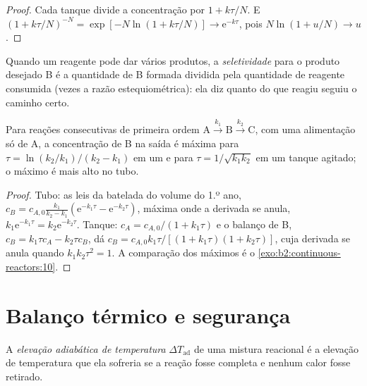 \begin{proof}
Cada tanque divide a concentração por $1 + k\tau/N$. E $(1 +
k\tau/N)^{-N} = \exp[-N\ln(1 + k\tau/N)] \to \mathrm e^{-k\tau}$, pois
$N\ln(1 + u/N) \to u$.
\end{proof}

\begin{definition}[Seletividade]\label{def:b2:continuous-reactors:selectivity}
Quando um reagente pode dar vários produtos, a \emph{seletividade}
para o produto desejado B é a quantidade de B formada dividida pela
quantidade de reagente consumida (vezes a razão estequiométrica): ela diz
quanto do que reagiu seguiu o caminho certo.
\end{definition}

\begin{proposition}\label{prop:b2:continuous-reactors:consecutive}
Para reações consecutivas de primeira ordem $\mathrm A \xrightarrow{k_1} \mathrm B
\xrightarrow{k_2} \mathrm C$, com uma alimentação só de A, a concentração
de B na saída é máxima para $\tau = \ln(k_2/k_1)/(k_2 - k_1)$ em um
 e para $\tau = 1/\sqrt{k_1k_2}$ em um tanque
agitado; o máximo é mais alto no tubo.
\end{proposition}

\begin{proof}
Tubo: as leis da batelada do volume do 1.º ano, $c_B = c_{A,0}\frac{k_1}{k_2 - k_1}
(\mathrm e^{-k_1\tau} - \mathrm e^{-k_2\tau})$, máxima onde a derivada
se anula, $k_1\mathrm e^{-k_1\tau} = k_2\mathrm e^{-k_2\tau}$. Tanque: $c_A =
c_{A,0}/(1 + k_1\tau)$ e o balanço de B, $c_B = k_1\tau c_A - k_2\tau c_B$,
dá $c_B = c_{A,0}k_1\tau/[(1 + k_1\tau)(1 + k_2\tau)]$, cuja derivada
se anula quando $k_1k_2\tau^2 = 1$. A comparação dos máximos é o
\cref{exo:b2:continuous-reactors:10}.
\end{proof}

\section{Balanço térmico e segurança}

\begin{definition}\label{def:b2:continuous-reactors:adiabatic-rise}
A \emph{elevação adiabática de temperatura}
$\Delta T_{\text{ad}}$ de uma mistura reacional é a elevação de temperatura
que ela sofreria se a reação fosse completa e nenhum calor fosse retirado.
\end{definition}

